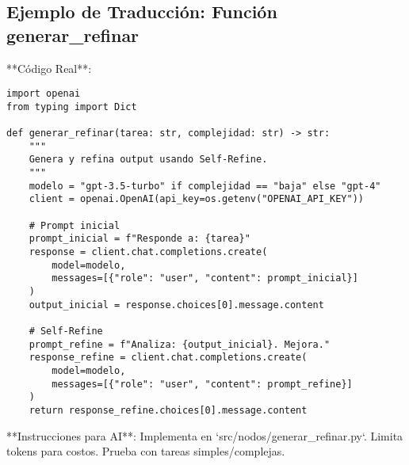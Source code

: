 \documentclass{article}
\begin{document}
\subsection{Ejemplo de Traducción: Función generar_refinar}
**Código Real**:
\begin{lstlisting}
import openai
from typing import Dict

def generar_refinar(tarea: str, complejidad: str) -> str:
    """
    Genera y refina output usando Self-Refine.
    """
    modelo = "gpt-3.5-turbo" if complejidad == "baja" else "gpt-4"
    client = openai.OpenAI(api_key=os.getenv("OPENAI_API_KEY"))
    
    # Prompt inicial
    prompt_inicial = f"Responde a: {tarea}"
    response = client.chat.completions.create(
        model=modelo,
        messages=[{"role": "user", "content": prompt_inicial}]
    )
    output_inicial = response.choices[0].message.content
    
    # Self-Refine
    prompt_refine = f"Analiza: {output_inicial}. Mejora."
    response_refine = client.chat.completions.create(
        model=modelo,
        messages=[{"role": "user", "content": prompt_refine}]
    )
    return response_refine.choices[0].message.content
\end{lstlisting}

**Instrucciones para AI**: Implementa en `src/nodos/generar_refinar.py`. Limita tokens para costos. Prueba con tareas simples/complejas.
\end{document}
